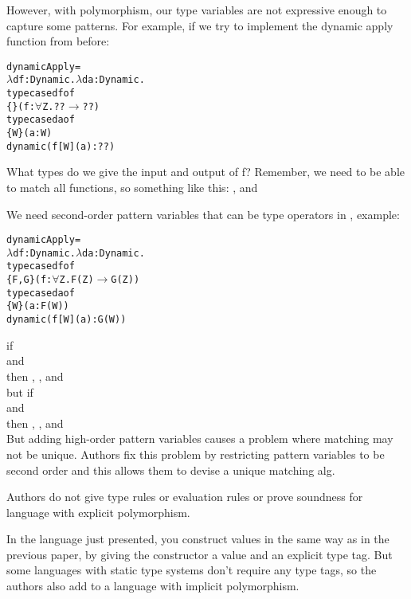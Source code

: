\documentclass[12pt]{article}	%
\begin{document}
However, with polymorphism, our type variables are not expressive enough to capture some patterns. For example, if we try to implement the dynamic apply function from before:

	\begin{alltt}
	dynamicApply = 
	  \(\lambda\)df:Dynamic.\(\lambda\)da:Dynamic.
	    typecase df of
	      \{\} (f:\(\forall\)Z.??\(\rightarrow\)??)
	        typecase da of
	          \{W\} (a:W)
	            dynamic( f[W](a):?? )
	\end{alltt}

What types do we give the input and output of f? Remember, we need to be able to match all functions, so something like this: , and 

We need second-order pattern variables that can be type operators in \typecase, example:
	\begin{alltt}
	dynamicApply = 
	  \(\lambda\)df:Dynamic.\(\lambda\)da:Dynamic.
	    typecase df of
	      \{F,G\} (f:\(\forall\)Z.F(Z)\(\rightarrow\)G(Z))
	        typecase da of
	          \{W\} (a:F(W))
	            dynamic( f[W](a):G(W) )
	\end{alltt}
	if  \\
	and  \\
	then , , and  \\
	but if  \\
	and  \\
	then , , and  \\

But adding high-order pattern variables causes a problem where matching may not be unique. Authors fix this problem by restricting pattern variables to be second order and this allows them to devise a unique matching alg.

Authors do not give type rules or evaluation rules or prove soundness for language with explicit polymorphism.

In the language just presented, you construct \Dynamic values in the same way as in the previous paper, by giving the constructor a value and an explicit type tag. But some languages with static type systems don't require any type tags, so the authors also add \Dynamic to a language with implicit polymorphism.
\end{document}
